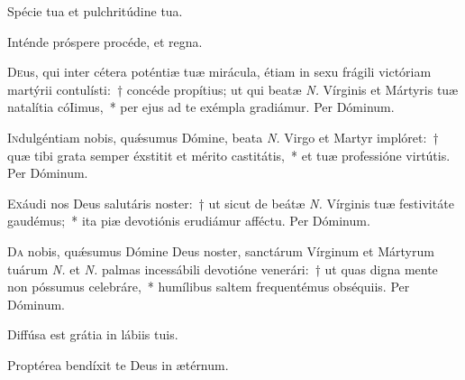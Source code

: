 \documentclass[vesperale_romanum.tex]{subfiles}
\begin{document}

\vel


\vv Spécie tua et pulchritúdine tua. \tpalleluia

\rr Inténde próspere procéde, et regna. \tpalleluia

\admagnificat
\label{an_veni_sponsa_christi_i_vesperis_solesmes_1961}


\lettrine{D}{e}us, qui inter cétera poténtiæ tuæ mirácula, étiam in sexu frágili vi\-ctóriam martýrii contulísti:~† concéde propítius; ut qui beatæ \textit{N.} Vírginis et Mártyris tuæ natalítia cóIimus,~* per ejus ad te exémpla gradiámur. Per Dóminum.

\aliaoratio

\lettrine{I}{n}dulgéntiam nobis, quǽsumus Dómine, beata \textit{N.} Virgo et Martyr implóret:~† quæ tibi grata semper éxstitit et mérito castitátis,~* et tuæ professióne virtútis. Per Dóminum.



\lettrine{E}{x}áudi nos Deus salutáris noster:~† ut sicut de beátæ \textit{N.} Vírginis tuæ festivitáte gaudémus;~* ita piæ devotiónis erudiámur affé\-ctu.
Per Dóminum.


\label{an_prudentes_virgines_solesmes_1961}

\oratio

\lettrine{D}{a} nobis, quǽsumus Dómine Deus noster, san\-ctárum Vírginum et Mártyrum tuárum \textit{N.} et \textit{N.} palmas incessábili devotióne venerári:~† ut quas digna mente non póssumus celebráre,~* humílibus saltem frequentémus obséquiis. Per Dóminum.


\omniapraeter %

\vv Diffúsa est grátia in lábiis tuis. \tpalleluia

\rr Proptérea bendíxit te Deus in ætérnum. \tpalleluia

\admagnificat
\label{an_veni_sponsa_christi_ii_vesperis_solesmes_1961}
\end{document}
